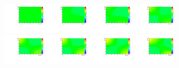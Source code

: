 \begin{figure}[thb]
  \centering
\includegraphics[width=0.2\textwidth]{figures/sec-background/correlation/res_th2F_res_th2f_res_alpha_00_n200.pdf}
\includegraphics[width=0.2\textwidth]{figures/sec-background/correlation/res_th2F_res_th2f_res_alpha_01_n200.pdf}
\includegraphics[width=0.2\textwidth]{figures/sec-background/correlation/res_th2F_res_th2f_res_alpha_02_n200.pdf}
\includegraphics[width=0.2\textwidth]{figures/sec-background/correlation/res_th2F_res_th2f_res_alpha_03_n200.pdf}
\includegraphics[width=0.2\textwidth]{figures/sec-background/correlation/res_th2F_res_th2f_res_alpha_04_n200.pdf}
\includegraphics[width=0.2\textwidth]{figures/sec-background/correlation/res_th2F_res_th2f_res_alpha_05_n200.pdf}
\includegraphics[width=0.2\textwidth]{figures/sec-background/correlation/res_th2F_res_th2f_res_alpha_06_n200.pdf}
\includegraphics[width=0.2\textwidth]{figures/sec-background/correlation/res_th2F_res_th2f_res_alpha_07_n200.pdf}

\end{figure}
